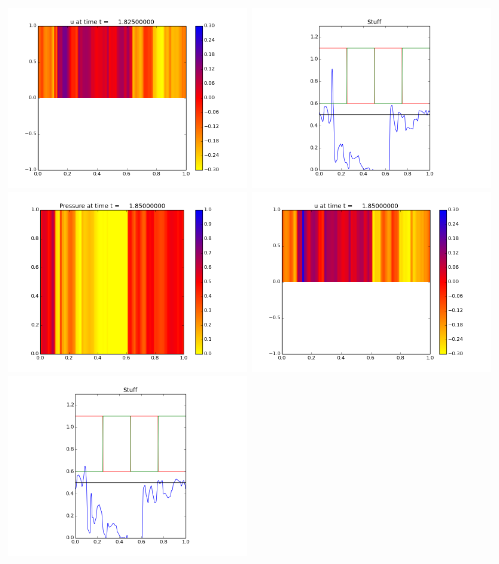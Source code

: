 \documentclass[11pt]{article}
\begin{document}
\includegraphics[width=0.475\textwidth]{frame0073fig1.png}
\vskip 10pt 
\includegraphics[width=0.475\textwidth]{frame0073fig3.png}
\vskip 10pt 
\includegraphics[width=0.475\textwidth]{frame0074fig0.png}
\includegraphics[width=0.475\textwidth]{frame0074fig1.png}
\vskip 10pt 
\includegraphics[width=0.475\textwidth]{frame0074fig3.png}
\end{document}
